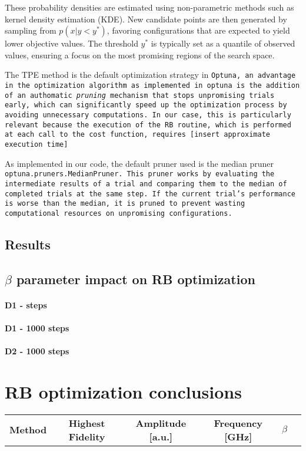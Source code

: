 These probability densities are estimated using non-parametric methods such as kernel density estimation (KDE). 
New candidate points are then generated by sampling from $p(x | y < y^*)$, favoring configurations that are expected to yield lower objective values. The threshold $y^*$ is typically set as a quantile of observed values, ensuring a focus on the most promising regions of the search space.

The TPE method is the default optimization strategy in \tt{Optuna}, an advantage in the optimization algorithm as implemented in optuna is the addition of an authomatic \textit{pruning} mechanism that stops  unpromising trials early, which can significantly speed up the optimization process by avoiding unnecessary computations.
In our case, this is particularly relevant because the execution of the RB routine, which is performed at each call to the cost function, requires [insert approximate execution time]

As implemented in our code, the default pruner used is the median pruner \tt{optuna.pruners.MedianPruner}. 
This pruner works by evaluating the intermediate results of a trial and comparing them to the median of completed trials at the same step. 
If the current trial's performance is worse than the median, it is pruned to prevent wasting computational resources on unpromising configurations. 

\subsection{Results}

\subsection{$\beta$ parameter impact on RB optimization}

\paragraph{D1 - steps}

\paragraph{D1 - 1000 steps}

\paragraph{D2 - 1000 steps}



\section{RB optimization conclusions}

\begin{tabular}{lccccc}
    \textbf{Method} & \textbf{Highest Fidelity} & \textbf{Amplitude [a.u.]} & \textbf{Frequency [GHz]} & \textbf{$\beta$} \\

\end{tabular}